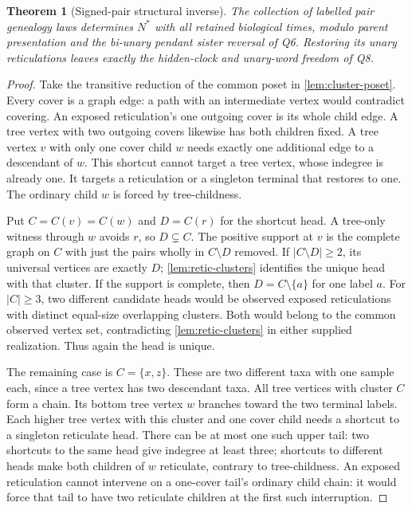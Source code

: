 \documentclass[11pt]{article}
\newtheorem{theorem}{Theorem}[section]
\begin{document}
\begin{theorem}[Signed-pair structural inverse]
\label{thm:structural-inverse}
The collection of labelled pair genealogy laws determines $N^*$ with all
retained biological times, modulo parent presentation and the bi-unary
pendant sister reversal of Q6.  Restoring its unary reticulations leaves
exactly the hidden-clock and unary-word freedom of Q8.
\end{theorem}
\begin{proof}
Take the transitive reduction of the common poset in
\cref{lem:cluster-poset}.  Every cover is a graph edge: a path with an
intermediate vertex would contradict covering.  An exposed reticulation's
one outgoing cover is its whole child edge.  A tree vertex with two outgoing
covers likewise has both children fixed.  A tree vertex $v$ with only one
cover child $w$ needs exactly one additional edge to a descendant of $w$.
This shortcut cannot target a tree vertex, whose indegree is already one.
It targets a reticulation or a singleton terminal that restores to one.
The ordinary child $w$ is forced by tree-childness.

Put $C=C(v)=C(w)$ and $D=C(r)$ for the shortcut head.  A tree-only witness
through $w$ avoids $r$, so $D\subsetneq C$.  The positive support at $v$ is
the complete graph on $C$ with just the pairs wholly in $C\setminus D$
removed.  If $|C\setminus D|\ge2$, its universal vertices are exactly $D$;
\cref{lem:retic-clusters} identifies the unique head with that cluster.  If
the support is complete, then $D=C\setminus\{a\}$ for one label $a$.
For $|C|\ge3$, two different candidate heads would be observed exposed
reticulations with distinct equal-size overlapping clusters.  Both would
belong to the common observed vertex set, contradicting
\cref{lem:retic-clusters} in either supplied realization.  Thus again the
head is unique.

The remaining case is $C=\{x,z\}$.  These are two different taxa with one
sample each, since a tree vertex has two descendant taxa.  All tree vertices
with cluster $C$ form a chain.  Its bottom tree vertex $w$ branches toward
the two terminal labels.  Each higher tree vertex with this cluster and one
cover child needs a shortcut to a singleton reticulate head.  There can be
at most one such upper tail: two shortcuts to the same head give indegree
at least three; shortcuts to different heads make both children of $w$
reticulate, contrary to tree-childness.  An exposed reticulation cannot
intervene on a one-cover tail's ordinary child chain: it would force that
tail to have two reticulate children at the first such interruption.


\end{proof}
\end{document}

